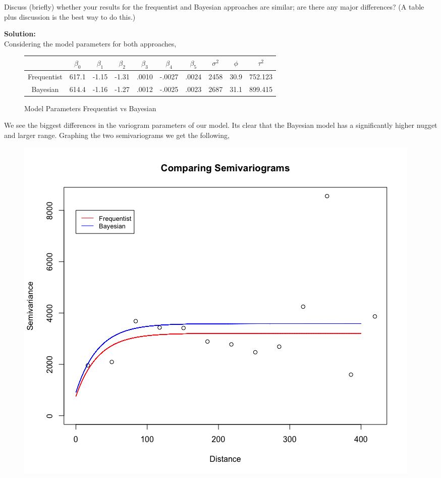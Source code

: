 \documentclass[12pt]{article}
\makeatletter
\theoremstyle{homework}
\newenvironment{exercise}[1]
{\def\@currentlabel{#1}\exercisecore}
{\endexercisecore}
\newcommand{\localhead}[1]{\par\smallskip\noindent\textbf{#1}\nobreak\\}%
\newcommand\solution{\localhead{Solution:}}
\makeatother
\begin{document}
\begin{exercise}{7} Discuss (briefly) whether your results for the frequentist and Bayesian approaches are similar; are there any major differences? 
  (A table plus discussion is the best way to do this.)\\
  \solution Considering the model parameters for both approaches, 
  \begin{figure}[H]
    \begin{center}
      \caption{Model Parameters Frequentist vs Bayesian}
    \begin{tabular}{|c||c|c|c|c|c|c|c|c|c| }
      \hline
       &$\beta_0$ & $\beta_1$ & $\beta_2$ & $\beta_3$ & $\beta_4$ & $\beta_5$ & $\sigma^2$& $\phi$    & $\tau^2$ \\ 
      \hline 
      Frequentist &  617.1    & -1.15     & -1.31     &  .0010    & -.0027    &  .0024    & 2458       & 30.9   & 752.123\\
      Bayesian    & 614.4     &-1.16      &-1.27      & .0012     &-.0025     & .0023     & 2687      & 31.1   & 899.415\\
      \hline
     \end{tabular}
    \end{center} 
  \end{figure}
  We see the biggest differences in the variogram parameters of our model. Its clear that the Bayesian model has a significantly higher 
  nugget and larger range. Graphing the two semivariograms we get the following, 
  \begin{figure}[H]
    \begin{center}
    \includegraphics[width = \textwidth]{Rplot20.png}

\end{center}
\end{figure}
\end{exercise}
\end{document}
